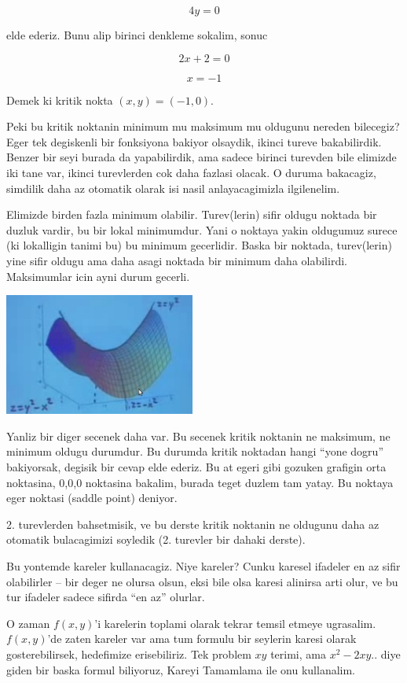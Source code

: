 \documentclass[12pt,fleqn]{article}
\begin{document}
\[ 4y = 0 \]

elde ederiz. Bunu alip birinci denkleme sokalim, sonuc

\[ 2x + 2 = 0 \]

\[ x = -1 \]

Demek ki kritik nokta $(x,y) = (-1,0)$. 

Peki bu kritik noktanin minimum mu maksimum mu oldugunu nereden bilecegiz?
Eger tek degiskenli bir fonksiyona bakiyor olsaydik, ikinci tureve
bakabilirdik. Benzer bir seyi burada da yapabilirdik, ama sadece birinci
turevden bile elimizde iki tane var, ikinci turevlerden cok daha fazlasi
olacak. O duruma bakacagiz, simdilik daha az otomatik olarak isi nasil
anlayacagimizla ilgilenelim. 

Elimizde birden fazla minimum olabilir. Turev(lerin) sifir oldugu noktada
bir duzluk vardir, bu bir lokal minimumdur. Yani o noktaya yakin oldugumuz
surece (ki lokalligin tanimi bu) bu minimum gecerlidir. Baska bir noktada,
turev(lerin) yine sifir oldugu ama daha asagi noktada bir minimum daha
olabilirdi. Maksimumlar icin ayni durum gecerli.

\includegraphics[height=4cm]{9_4.png}

Yanliz bir diger secenek daha var. Bu secenek kritik noktanin ne maksimum,
ne minimum oldugu durumdur. Bu durumda kritik noktadan hangi ``yone dogru''
bakiyorsak, degisik bir cevap elde ederiz. Bu at egeri gibi gozuken
grafigin orta noktasina, 0,0,0 noktasina bakalim, burada teget duzlem tam
yatay. Bu noktaya eger noktasi (saddle point) deniyor. 

2. turevlerden bahsetmisik, ve bu derste kritik noktanin ne oldugunu daha
az otomatik bulacagimizi soyledik (2. turevler bir dahaki derste). 

Bu yontemde kareler kullanacagiz. Niye kareler? Cunku karesel ifadeler en
az sifir olabilirler -- bir deger ne olursa olsun, eksi bile olsa karesi
alinirsa arti olur, ve bu tur ifadeler sadece sifirda ``en az'' olurlar.

O zaman $f(x,y)$'i karelerin toplami olarak tekrar temsil etmeye
ugrasalim. $f(x,y)$'de zaten kareler var ama tum formulu bir seylerin
karesi olarak gosterebilirsek, hedefimize erisebiliriz. Tek problem $xy$
terimi, ama $x^2 - 2xy..$ diye giden bir baska formul biliyoruz, Kareyi
Tamamlama ile onu kullanalim.
\end{document}
